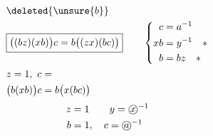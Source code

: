 \[
\begin{aligned}
&\deleted{\unsure{b}}\\
&\boxed{\bigl((bz)(xb)\bigr)c=b\bigl((zx)(bc)\bigr)}
\qquad\left\{\begin{aligned}c&=a^{-1}\\xb&=y^{-1}\quad *\\ b&=bz\quad *\end{aligned}\right.\\
&z=1,\ c=\\
&\bigl(b(xb)\bigr)c=b\bigl(x(bc)\bigr)
\end{aligned}
\]
\[
\begin{aligned}
z&=1\qquad y={\text{\textcircled{$x$}}}^{-1}\\
b&=1,\quad c={\text{\textcircled{$a$}}}^{-1}
\end{aligned}
\]
